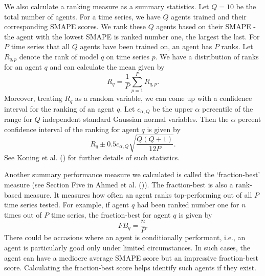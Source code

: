 We also calculate a ranking measure as a summary statistics. Let $Q=10$ be the total number of agents. For a time series, we have $Q$ agents trained and their corresponding SMAPE scores. We rank these $Q$ agents based on their SMAPE - the agent with the lowest SMAPE is ranked number one, the largest the last. For $P$ time series that all $Q$ agents have been trained on, an agent has $P$ ranks. Let $R_{q, p}$ denote the rank of model $q$ on time series $p$. We have a distribution of ranks for an agent $q$ and can calculate the mean given by
\begin{equation*}
    R_q = \frac{1}{P} \sum_{p = 1}^{P}R_{q, p}.
\end{equation*}
Moreover, treating $R_q$ as a random variable, we can come up with a confidence interval for the ranking of an agent $q$. Let $c_{\alpha, Q}$ be the upper $\alpha$ percentile of the range for $Q$ independent standard Gaussian normal variables. Then the $\alpha$ percent confidence interval of the ranking for agent $q$ is given by
\begin{equation*}
    R_q \pm 0.5 c_{\alpha, Q} \sqrt{\frac{Q(Q+1)}{12 P}}.
\end{equation*}
See Koning et al. (\citeyear{KONING2005397}) for further details of such statistics.

Another summary performance measure we calculated is called the `fraction-best' measure (see Section Five in Ahmed et al. (\citeyear{2010EmpiricalMLComparison})). The fraction-best is also a rank-based measure. It measures how often an agent ranks top-performing out of all $P$ time series tested. For example, if agent $q$ had been ranked number one for $n$ times out of $P$ time series, the fraction-best for agent $q$ is given by
\begin{equation*}
    FB_q = \frac{n}{P}.
\end{equation*}
There could be occasions where an agent is conditionally performant, i.e., an agent is particularly good only under limited circumstances. In such cases, the agent can have a mediocre average SMAPE score but an impressive fraction-best score. Calculating the fraction-best score helps identify such agents if they exist.

